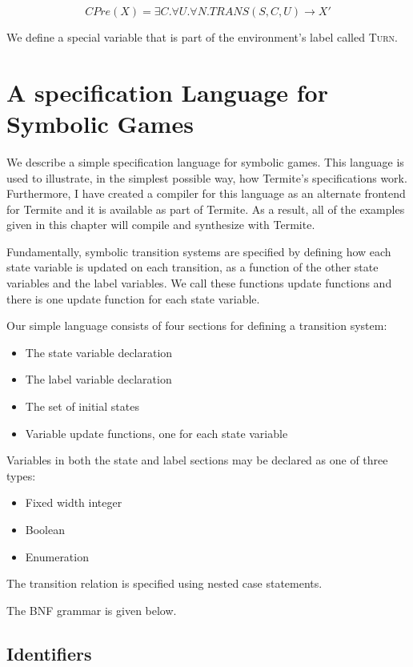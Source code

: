 \begin{equation}
    CPre(X) = \exists C. \forall U. \forall N. TRANS(S, C, U) \rightarrow X'
\end{equation}

We define a special variable that is part of the environment's label called \textsc{Turn}.

\section{A specification Language for Symbolic Games}

We describe a simple specification language for symbolic games. This language is used to illustrate, in the simplest possible way, how Termite's specifications work. Furthermore, I have created a compiler for this language as an alternate frontend for Termite and it is available as part of Termite. As a result, all of the examples given in this chapter will compile and synthesize with Termite.

Fundamentally, symbolic transition systems are specified by defining how each state variable is updated on each transition, as a function of the other state variables and the label variables. We call these functions update functions and there is one update function for each state variable. 

Our simple language consists of four sections for defining a transition system:
\begin{itemize}
    \item The state variable declaration
    \item The label variable declaration
    \item The set of initial states
    \item Variable update functions, one for each state variable
\end{itemize}

Variables in both the state and label sections may be declared as one of three types:
\begin{itemize}
    \item Fixed width integer
    \item Boolean
    \item Enumeration
\end{itemize}

The transition relation is specified using nested case statements.

The BNF grammar is given below.

\subsection{Identifiers}

